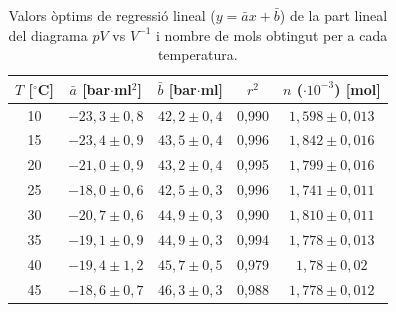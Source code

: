 \documentclass[12pt,twosides,onecolumn,openany]{article}
\begin{document}
\vspace{1.6cm}
\begin{table}[h]
  \centering
  \caption{\footnotesize{Valors òptims de regressió lineal ($y=\bar{a}x+\bar{b}$) de la part lineal del diagrama  $pV$ vs $V^{-1}$ i nombre de mols obtingut per a cada temperatura.}}
  \renewcommand{\arraystretch}{1.85}
  \begin{tabular}{c|c|c|c|c}
     \multirow{1}{2cm}{\centering $T$ [$^\circ$C]} & \multirow{1}{2.8cm}{\centering $\bar{a}$ [bar$\cdot$ml$^{2}$]} & \multirow{1}{2.8cm}{\centering $\bar{b}$ [bar$\cdot$ml]} & \multirow{1}{2cm}{\centering $r^2$} & \multirow{1}{2.8cm}{\centering $n$ ($\cdot 10^{-3}$) [mol]} \\
     \hline\hline
     10 & $-23,3\pm0,8$ & $42,2\pm0,4$ & 0,990 & $1,598\pm0,013$ \\
     15 & $-23,4\pm0,9$ & $43,5\pm0,4$ & 0,996 & $1,842\pm0,016$ \\
     20 & $-21,0\pm0,9$ & $43,2\pm0,4$ & 0,995 & $1,799\pm0,016$ \\
     25 & $-18,0\pm0,6$ & $42,5\pm0,3$ & 0,996 & $1,741\pm0,011$ \\
     30 & $-20,7\pm0,6$ & $44,9\pm0,3$ & 0,990 & $1,810\pm0,011$ \\
     35 & $-19,1\pm0,9$ & $44,9\pm0,3$ & 0,994 & $1,778\pm0,013$ \\
     40 &  $-19,4\pm1,2$  & $45,7\pm0,5$ & 0,979 & $1,78\pm0,02$ \\
     45 & $-18,6\pm0,7$ & $46,3\pm0,3$ & 0,988 & $1,778\pm0,012$ 
           
  \end{tabular}
  \renewcommand{\arraystretch}{1}
  \label{tau:dades_iteracio_reg}
\end{table}
\vfill
\newpage
\end{document}
